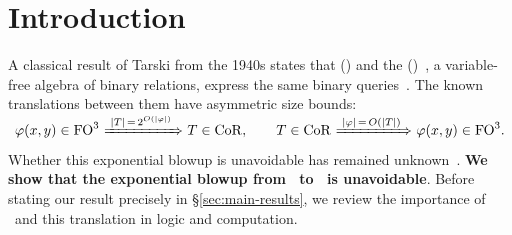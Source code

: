\section{Introduction}

A classical result of Tarski from the 1940s states that  (\FOthree) and the  (\CoR)~\citep{tarski1941}, a variable-free algebra of binary relations, express the same binary queries~\citep{tarski-givant1987,givant2006}.
The known translations between them have asymmetric size bounds:
\[
\varphi(x,y)\in\mathrm{FO}^3
\ \smash{\xRightarrow{\;|T|\,=\,2^{O(|\varphi|)}\;}}\ 
T \in\CoR,
\qquad
T \in\mathrm{CoR}
\ \smash{\xRightarrow{\;|\varphi|\,=\,O(|T|)\;}}\ 
\varphi(x,y)\in\FOthree.
\]
Whether this exponential blowup is unavoidable has remained unknown~\citep{FletcherEtAl2015,nakamura2022,nakamura-uezato2027}.
\textbf{We show that the exponential blowup from \FOthree\ to \CoR\ is unavoidable}.
Before stating our result precisely in \S\ref{sec:main-results},
we review the importance of \FOthree\ and this translation in logic and computation.

